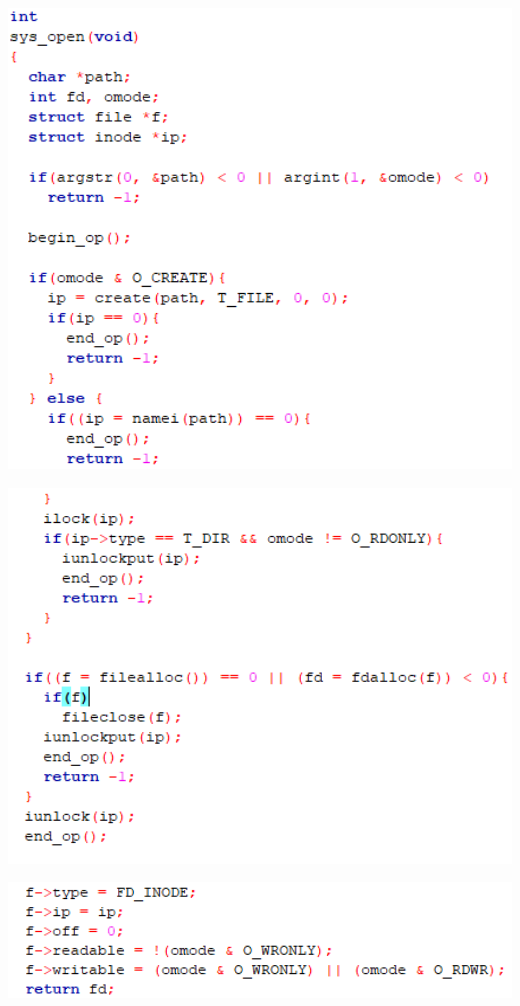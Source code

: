 \includegraphics[width=6in]{figures/eg_file/image169.png}

\includegraphics[width=6in]{figures/eg_file/image170.png}

\includegraphics[width=6in]{figures/eg_file/image171.png}



